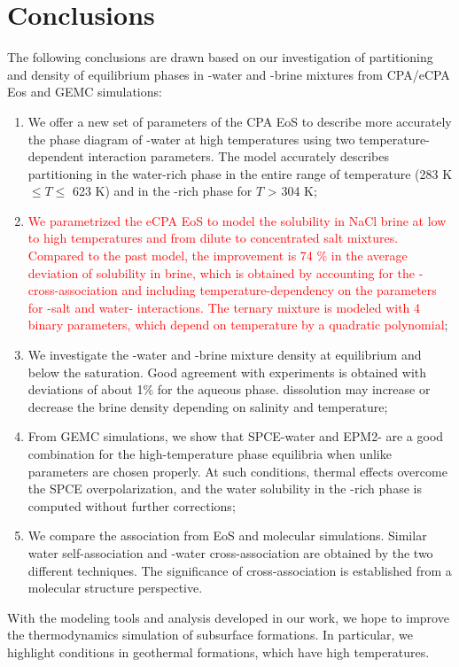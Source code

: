 \section{Conclusions}
The following conclusions are drawn based on our investigation of partitioning and density of equilibrium phases in -water and -brine mixtures from CPA/eCPA Eos and GEMC simulations:

\begin{enumerate}
    \item We offer a new set of parameters of the CPA EoS to describe more accurately the phase diagram of -water at high temperatures using two temperature-dependent interaction parameters. The model accurately describes partitioning in the water-rich phase in the entire range of temperature (283 K$ \leq T \leq$ 623 K) and in the -rich phase for $T$ > 304 K;
    \item \textcolor{red}{We parametrized the eCPA EoS to model the  solubility in NaCl brine at low to high temperatures and from dilute to concentrated salt mixtures. Compared to the past model, the improvement is 74 \% in the average deviation of  solubility in brine, which is obtained by accounting for the - cross-association and including temperature-dependency on the parameters for -salt and water- interactions. The ternary mixture is modeled with 4 binary parameters, which depend on temperature by a quadratic polynomial};
    \item We investigate the -water and -brine mixture density at equilibrium and below the saturation. Good agreement with experiments is obtained with deviations of about 1\% for the aqueous phase.  dissolution may increase or decrease the brine density depending on salinity and temperature;
    \item From GEMC simulations, we show that SPCE-water and EPM2- are a good combination for the high-temperature phase equilibria when unlike parameters are chosen properly. At such conditions, thermal effects overcome the SPCE overpolarization, and the water solubility in the -rich phase is computed without further corrections;
    \item We compare the association from EoS and molecular simulations. Similar water self-association and -water cross-association are obtained by the two different techniques. The significance of  cross-association is established from a molecular structure perspective.
\end{enumerate}

With the modeling tools and analysis developed in our work, we hope to improve the thermodynamics simulation of subsurface formations. In particular, we highlight conditions in geothermal formations, which have high temperatures.
